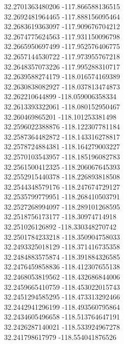 {32.2701363480206	-117.866588136515\\
32.2692481964465	-117.888156095464\\
32.2683619363097	-117.909676704212\\
32.2674775624563	-117.931150096798\\
32.2665950697499	-117.952576406775\\
32.2657144530722	-117.973955767218\\
32.2648357073226	-117.995288310717\\
32.2639588274179	-118.016574169389\\
32.2630838082927	-118.037813474873\\
32.262210644899	-118.059006358334\\
32.2613393322061	-118.080152950467\\
32.260469865201	-118.101253381498\\
32.2596022388876	-118.122307781184\\
32.2587364482872	-118.143316278817\\
32.2578724884381	-118.164279003227\\
32.2570103543957	-118.185196082783\\
32.2561500412325	-118.206067645393\\
32.2552915440378	-118.226893818508\\
32.2544348579176	-118.247674729127\\
32.2535799779951	-118.268410503791\\
32.2527268994097	-118.289101268595\\
32.2518756173177	-118.30974714918\\
32.251026126892	-118.330348270742\\
32.2501784233218	-118.350904758033\\
32.2493325018129	-118.371416735358\\
32.2484883575874	-118.391884326585\\
32.2476459858836	-118.412307655138\\
32.2468053819562	-118.432686844006\\
32.2459665410759	-118.453022015743\\
32.2451294585295	-118.473313292466\\
32.2442941296199	-118.493560795864\\
32.2434605496658	-118.513764647191\\
32.2426287140021	-118.533924967278\\
32.241798617979	-118.554041876526\\
}
